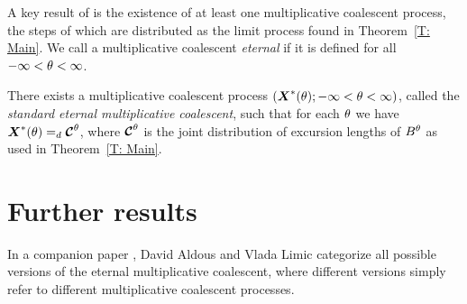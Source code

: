 A key result of \cite{Aldous.1997} is the existence of at least one multiplicative coalescent process, 
the steps of which are distributed as the limit process found in Theorem~\ref{T: Main}.
We call a multiplicative coalescent \emph{eternal} if it is defined for all $-\infty < \theta < \infty$.

\begin{theorem}
	There exists a multiplicative coalescent process
	$ (\boldsymbol{X}^*(\theta); -\infty < \theta < \infty) $,
	called the \emph{standard eternal multiplicative coalescent},
	such that for each $\theta$ we have $\boldsymbol{X}^*(\theta) =_d \boldsymbol{\mathcal{C}}^{\theta}$,
	where $\boldsymbol{\mathcal{C}}^{\theta}$ is the joint distribution of excursion lengths of $B^{\theta}$ as used in Theorem~\ref{T: Main}.
\end{theorem}


\section{Further results}

In a companion paper \cite{Aldous.1998}, 
David Aldous and Vlada Limic categorize all possible versions of the eternal multiplicative coalescent,
where different versions simply refer to different multiplicative coalescent processes.





